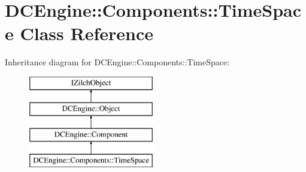 \hypertarget{classDCEngine_1_1Components_1_1TimeSpace}{\section{D\-C\-Engine\-:\-:Components\-:\-:Time\-Space Class Reference}
\label{classDCEngine_1_1Components_1_1TimeSpace}
}
Inheritance diagram for D\-C\-Engine\-:\-:Components\-:\-:Time\-Space\-:\begin{figure}[H]
\begin{center}
\leavevmode
\includegraphics[height=4.000000cm]{classDCEngine_1_1Components_1_1TimeSpace}
\end{center}
\end{figure}
